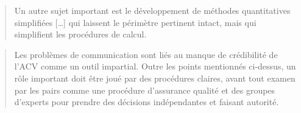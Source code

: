 \blockcquote[traduction]{udo_de_haes_applications_1993}{
Un autre sujet important est le développement de méthodes quantitatives simplifiées [\ldots]
qui laissent le périmètre pertinent intact, mais qui simplifient les procédures de calcul.
}

\blockcquote[traduction]{udo_de_haes_applications_1993}{
Les problèmes de communication sont liés au manque de crédibilité de l'ACV comme un outil impartial.
Outre les points mentionnés ci-dessus, un rôle important doit être joué par des procédures claires, avant tout examen par les pairs comme une procédure d'assurance qualité et des groupes d'experts pour prendre des décisions indépendantes et faisant autorité.
}

